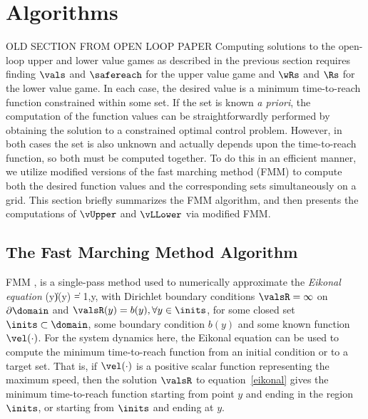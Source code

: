 \section{Algorithms}
\label{sec:algorithms}
OLD SECTION FROM OPEN LOOP PAPER
Computing solutions to the open-loop upper and lower value games as described in the previous section requires finding $\vals$ and $\safereach$ for the upper value game and $\wRs$ and $\Rs$ for the lower value game.
In each case, the desired value is a minimum time-to-reach function constrained within some set.
If the set is known \emph{a priori}, the computation of the function values can be straightforwardly performed by obtaining the solution to a constrained optimal control problem. 
However, in both cases the set is also unknown and actually depends upon the time-to-reach function, so both must be computed together.
To do this in an efficient manner, we utilize modified versions of the fast marching method (FMM) to compute both the desired function values and the corresponding sets simultaneously on a grid.
This section briefly summarizes the FMM algorithm, and then presents the computations of $\vUpper$ and $\vLLower$ via modified FMM.

\subsection{The Fast Marching Method Algorithm}
FMM \cite{SethSIAM, SethianBook, falconeLecture}, is a single-pass method used to numerically approximate the \emph{Eikonal equation}
\vspace{-0.1cm}
\bq\label{eikonal}
\vel(y)\|\nabla \valsR (y) \| = 1,\quad y\in\domain\setminus \inits,
\eq
with Dirichlet boundary conditions $\valsR=\infty$ on $\partial\domain$ and $\valsR(y)=b(y),\forall y\in\inits$, for some closed set $\inits \subset\domain$, some boundary condition $b(y)$ and some known function $\vel(\cdot)$. 
For the system dynamics here, the Eikonal equation can be used to compute the minimum time-to-reach function from an initial condition or to a target set.
That is, if $\vel(\cdot)$ is a positive scalar function representing the maximum speed, then the solution $\valsR$ to equation~\eqref{eikonal} gives the minimum time-to-reach function starting from point $y$ and ending in the region $\inits$, or starting from $\inits$ and ending at $y$. 


